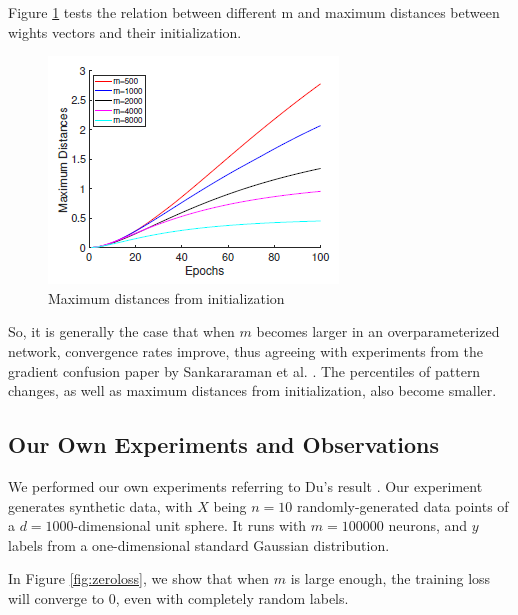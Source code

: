 \documentclass{article}
\begin{document}
Figure \ref{fig:maxdistance} tests the relation between different m and maximum distances between wights vectors and their initialization.
\begin{figure}[htb]
	\centering
    \includegraphics[scale= 0.5]{pics/overparameterization/maximumdistance.PNG}
    \caption{Maximum distances from initialization}
	\label{fig:maxdistance}
\end{figure}

So, it is generally the case that when $m$ becomes larger in an overparameterized network, convergence rates improve, thus agreeing with experiments from the gradient confusion paper by Sankararaman et al. \cite{gradient_confusion}. The percentiles of pattern changes, as well as maximum distances from initialization, also become smaller.
\\

\subsection{Our Own Experiments and Observations}

We performed our own experiments referring to Du's result \cite{SimonDu}. Our experiment generates synthetic data, with $X$ being $n = 10$ randomly-generated data points of a $d = 1000$-dimensional unit sphere. It runs with $m = 100000$ neurons, and $y$ labels from a one-dimensional standard Gaussian distribution.

In Figure \ref{fig:zeroloss}, we show that when $m$ is large enough, the training loss will converge to 0, even with completely random labels. 
\end{document}
